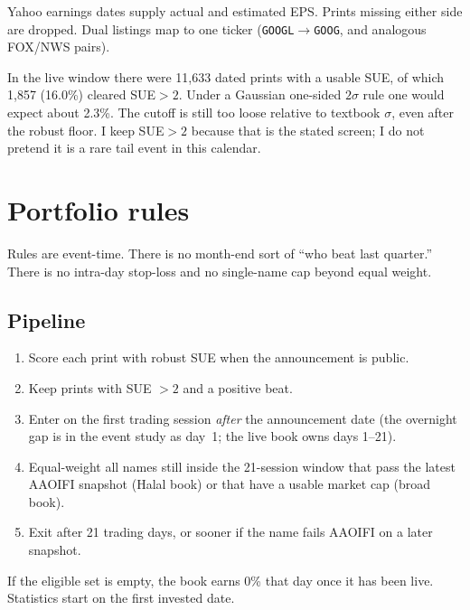 \documentclass[11pt,letterpaper]{article}
\begin{document}
Yahoo earnings dates supply actual and estimated EPS. Prints missing either side are dropped. Dual listings map to one ticker (\texttt{GOOGL}$\to$\texttt{GOOG}, and analogous FOX/NWS pairs).

In the live window there were 11{,}633 dated prints with a usable SUE, of which 1{,}857 (16.0\%) cleared SUE$>2$. Under a Gaussian one-sided $2\sigma$ rule one would expect about 2.3\%. The cutoff is still too loose relative to textbook $\sigma$, even after the robust floor. I keep SUE$>2$ because that is the stated screen; I do not pretend it is a rare tail event in this calendar.

\section{Portfolio rules}
\label{sec:rules}

Rules are event-time. There is no month-end sort of ``who beat last quarter.'' There is no intra-day stop-loss and no single-name cap beyond equal weight.

\subsection{Pipeline}

\begin{enumerate}
  \item Score each print with robust SUE when the announcement is public.
  \item Keep prints with SUE $> 2$ and a positive beat.
  \item Enter on the first trading session \emph{after} the announcement date (the overnight gap is in the event study as day~1; the live book owns days 1--21).
  \item Equal-weight all names still inside the 21-session window that pass the latest AAOIFI snapshot (Halal book) or that have a usable market cap (broad book).
  \item Exit after 21 trading days, or sooner if the name fails AAOIFI on a later snapshot.
\end{enumerate}

If the eligible set is empty, the book earns 0\% that day once it has been live. Statistics start on the first invested date.
\end{document}
